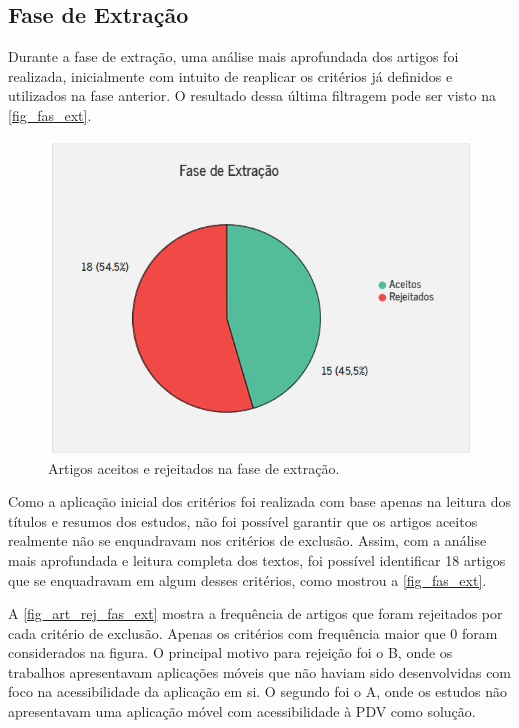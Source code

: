 \newpage{}

\subsection{Fase de Extração}

Durante a fase de extração, uma análise mais aprofundada dos artigos foi realizada, inicialmente com intuito de reaplicar os critérios já definidos e utilizados na fase anterior.
O resultado dessa última filtragem pode ser visto na \autoref{fig_fas_ext}.

\begin{figure}[htb]
	\caption{\label{fig_fas_ext}Artigos aceitos e rejeitados na fase de extração.}
	\begin{center}
	    \includegraphics[scale=0.85]{Imagens/msl/fase_extracao_artigos.png}
	\end{center}
\end{figure}

Como a aplicação inicial dos critérios foi realizada com base apenas na leitura dos títulos e resumos dos estudos, não foi possível garantir que os artigos aceitos realmente não se enquadravam nos critérios de exclusão.
Assim, com a análise mais aprofundada e leitura completa dos textos, foi possível identificar 18 artigos que se enquadravam em algum desses critérios, como mostrou a \autoref{fig_fas_ext}.

A \autoref{fig_art_rej_fas_ext} mostra a frequência de artigos que foram rejeitados por cada critério de exclusão.
Apenas os critérios com frequência maior que 0 foram considerados na figura.
O principal motivo para rejeição foi o B, onde os trabalhos apresentavam aplicações móveis que não haviam sido desenvolvidas com foco na acessibilidade da aplicação em si.
O segundo foi o A, onde os estudos não apresentavam uma aplicação móvel com acessibilidade à PDV como solução.

